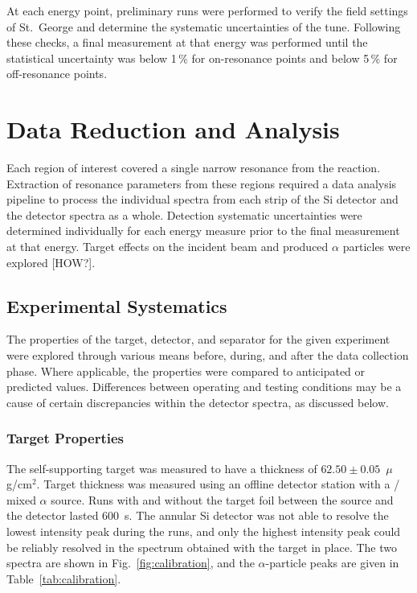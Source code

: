 At each energy point, preliminary runs were performed to verify the field
settings of St.\ George and determine the systematic uncertainties of the tune.
Following these checks, a final measurement at that energy was performed until
the statistical uncertainty was below 1\,\% for on-resonance points and below
5\,\% for off-resonance points.




\section{Data Reduction and Analysis}

Each region of interest covered a single narrow resonance from the \alpa{}
reaction. Extraction of resonance parameters from these regions required a
data analysis pipeline to process the individual spectra from each strip of
the Si detector and the detector spectra as a whole. Detection systematic
uncertainties were determined individually for each energy measure prior to
the final measurement at that energy. Target effects on the incident beam
and produced $\alpha$ particles were explored [HOW?].

\subsection{Experimental Systematics}
The properties of the target, detector, and separator for the given experiment
were explored through various means before, during, and after the data
collection phase. Where applicable, the properties were compared to anticipated
or predicted values. Differences between operating and testing conditions may
be a cause of certain discrepancies within the detector spectra, as discussed
below.

\subsubsection{Target Properties}
The self-supporting  target was measured to have a thickness of
$62.50 \pm 0.05$~$\mu$g/cm$^2$. Target thickness was measured using an offline
detector station with a / mixed $\alpha$ source. Runs
with and without the target foil between the source and the detector lasted
600~s. The annular Si detector was not able to resolve the lowest intensity
 peak during the runs, and only the highest intensity peak could
be reliably resolved in the spectrum obtained with the target in place. The two
spectra are shown in Fig.~\ref{fig:calibration}, and the $\alpha$-particle
peaks are given in Table~\ref{tab:calibration}.

